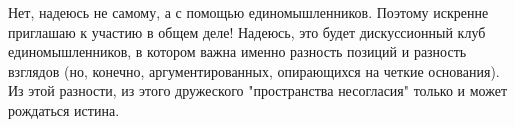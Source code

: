 Нет, надеюсь не самому, а с помощью единомышленников. Поэтому искренне
приглашаю к участию в общем деле! Надеюсь, это будет дискуссионный клуб
единомышленников, в котором важна именно разность позиций и разность взглядов
(но, конечно, аргументированных, опирающихся на четкие основания). Из этой
разности, из этого дружеского "пространства несогласия" только и может
рождаться истина.
